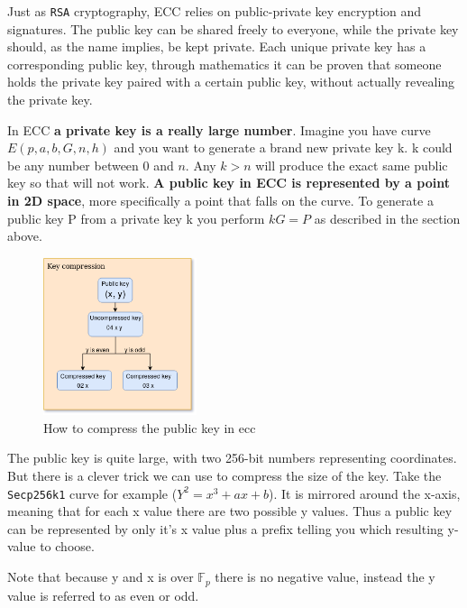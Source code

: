 Just as \texttt{RSA} cryptography, ECC relies on public-private key encryption and signatures. 
The public key can be shared freely to everyone, while the private key should, as the name implies, 
be kept private. Each unique private key has a corresponding public key, through mathematics it 
can be proven that someone holds the private key paired with a certain public key, without actually 
revealing the private key. 

In ECC \textbf{a private key is a really large number}. Imagine you have curve $E(p,a,b,G,n,h)$ 
and you want to generate a brand new private key k. k could be any number between 0 and $n$. Any 
$k > n$ will produce the exact same public key so that will not work. \textbf{A public key in ECC is 
represented by a point in 2D space}, more specifically a point that falls on the curve. To generate a 
public key P from a private key k you perform $kG = P$ as described in the section above.

\begin{figure}
	\begin{center}
		\includegraphics[width=0.4\textwidth]{background/images/key_compression.png}
	\end{center}
	\vspace{-8mm}
	\caption{How to compress the public key in ecc}
\end{figure}

The public key is quite large, with two 256-bit numbers representing coordinates. But there is a 
clever trick we can use to compress the size of the key. Take the \texttt{Secp256k1} curve for 
example ($Y^2=x^3+ax+b$). It is mirrored around the x-axis, meaning that for each x value there 
are two possible y values. Thus a public key can be represented by only it's x value plus a 
prefix telling you which resulting y-value to choose. 

Note that because y and x is over $\mathbb{F}_{p}$ there is no negative value, instead the y 
value is referred to as even or odd. 

